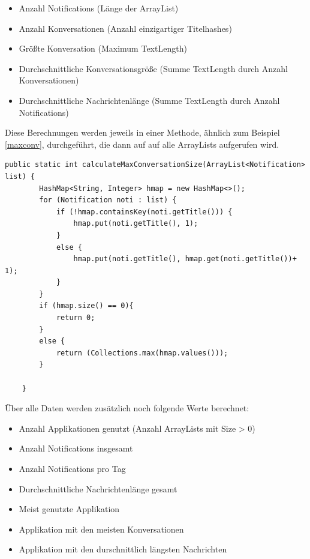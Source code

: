 \begin{itemize}
  \item Anzahl Notifications (Länge der ArrayList)
  \item Anzahl Konversationen (Anzahl einzigartiger Titelhashes)
  \item Größte Konversation (Maximum TextLength)
  \item Durchschnittliche Konversationsgröße (Summe TextLength durch Anzahl Konversationen)
  \item Durchschnittliche Nachrichtenlänge (Summe TextLength durch Anzahl Notifications)
\end{itemize}

Diese Berechnungen werden jeweils in einer Methode, ähnlich zum Beispiel \ref{maxconv}, durchgeführt, die dann auf auf alle ArrayLists aufgerufen wird.


\begin{lstlisting}[frame=single, caption =  calculateMaxConversationSize(), label=maxconv] 
    public static int calculateMaxConversationSize(ArrayList<Notification> list) {
        HashMap<String, Integer> hmap = new HashMap<>();
        for (Notification noti : list) {
            if (!hmap.containsKey(noti.getTitle())) {
                hmap.put(noti.getTitle(), 1);
            }
            else {
                hmap.put(noti.getTitle(), hmap.get(noti.getTitle())+ 1);
            }
        }
        if (hmap.size() == 0){
            return 0;
        }
        else {
            return (Collections.max(hmap.values()));
        }

    }
\end{lstlisting}


Über alle Daten werden zusätzlich noch folgende Werte berechnet:

\begin{itemize}
  \item Anzahl Applikationen genutzt (Anzahl ArrayLists mit Size > 0)
  \item Anzahl Notifications insgesamt
  \item Anzahl Notifications pro Tag
  \item Durchschnittliche Nachrichtenlänge gesamt
  \item Meist genutzte Applikation
  \item Applikation mit den meisten Konversationen
  \item Applikation mit den durschnittlich längsten Nachrichten  
\end{itemize}

